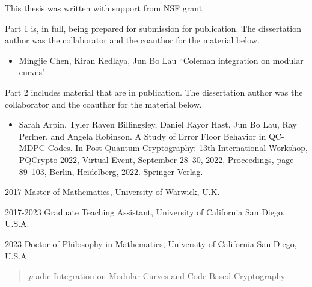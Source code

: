 \begin{frontmatter}
\begin{acknowledgements}
This thesis was written with support from NSF grant 

Part 1 is, in full, being prepared for submission for publication. The dissertation author was the collaborator and the coauthor for the material below.

\begin{itemize}
\item Mingjie Chen, Kiran Kedlaya, Jun Bo Lau ``Coleman integration on modular curves"
\end{itemize}

Part 2 includes material that are in publication. The dissertation author was the collaborator and the coauthor for the material below.

\begin{itemize}
\item Sarah Arpin, Tyler Raven Billingsley, Daniel Rayor Hast, Jun Bo Lau, Ray Perlner, and
 Angela Robinson. A Study of Error Floor Behavior in QC-MDPC Codes. In Post-Quantum
 Cryptography: 13th International Workshop, PQCrypto 2022, Virtual Event, September
 28–30, 2022, Proceedings, page 89–103, Berlin, Heidelberg, 2022.
 Springer-Verlag.
\end{itemize}

\end{acknowledgements}


%
%
\begin{vitapage}
\begin{vita}
  \item[2017] Master of Mathematics, University of Warwick, U.K.
  \item[2017-2023] Graduate Teaching Assistant, University of California San Diego, U.S.A.
  \item[2023] Doctor of Philosophy in Mathematics, University of California San Diego, U.S.A.
\end{vita}
\end{vitapage}


%
%
\begin{abstract}

\begin{center}
$p$-adic Integration on Modular Curves and Code-Based Cryptography

\vspace{8mm}


\end{center}
\end{abstract}
\end{frontmatter}
